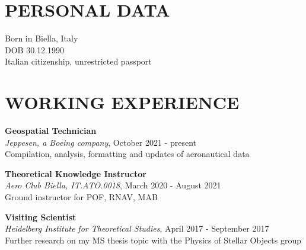 \documentclass[margin]{res}
\begin{document}
\begin{resume}


\section{PERSONAL DATA}
Born in Biella, Italy\\
DOB 30.12.1990\\
Italian citizenship, unrestricted passport

\section{WORKING EXPERIENCE}


\textbf{Geospatial Technician}\\
{\sl Jeppesen, a Boeing company}, October 2021 - present\\
Compilation, analysis, formatting and updates of aeronautical data 

\textbf{Theoretical Knowledge Instructor}\\
{\sl Aero Club Biella, IT.ATO.0018}, March 2020 - August 2021\\
Ground instructor for POF, RNAV, MAB

\textbf{Visiting Scientist}\\
{\sl Heidelberg Institute for Theoretical Studies}, April 2017 - September 2017\\
Further research on my MS thesis topic with the Physics of Stellar Objects group




\end{resume}
\end{document}
